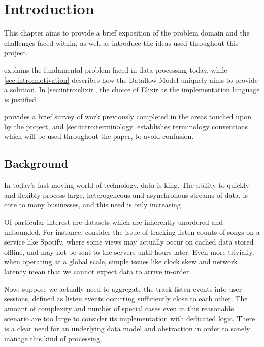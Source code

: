 \chapter{Introduction}\label{ch:intro}

This chapter aims to provide a brief exposition of the problem domain and the challenges faced within, as well as introduce the ideas used throughout this project.

 explains the fundamental problem faced in data processing today, while \cref{sec:intro:motivation} describes how the Dataflow Model uniquely aims to provide a solution.
In \cref{sec:intro:elixir}, the choice of Elixir as the implementation language is justified.

 provides a brief survey of work previously completed in the areas touched upon by the project, and \cref{sec:intro:terminology} establishes terminology conventions which will be used throughout the paper, to avoid confusion. 

\section{Background}\label{sec:intro:background}

In today's fast-moving world of technology, data is king.
The ability to quickly and flexibly process large, heterogeneous and asynchronous streams of data, is core to many businesses, and this need is only increasing \cite{Yin_2015}\cite{mit_bean_variety}.

Of particular interest are datasets which are inherently unordered and unbounded.
For instance, consider the issue of tracking listen counts of songs on a service like Spotify, where some views may actually occur on cached data stored offline, and may not be sent to the servers until hours later.
Even more trivially, when operating at a global scale, simple issues like clock skew and network latency mean that we cannot expect data to arrive in-order.

Now, suppose we actually need to aggregate the track listen events into user sessions, defined as listen events occurring sufficiently close to each other.
The amount of complexity and number of special cases even in this reasonable scenario are too large to consider its implementation with dedicated logic.
There is a clear need for an underlying data model and abstraction in order to sanely manage this kind of processing.

